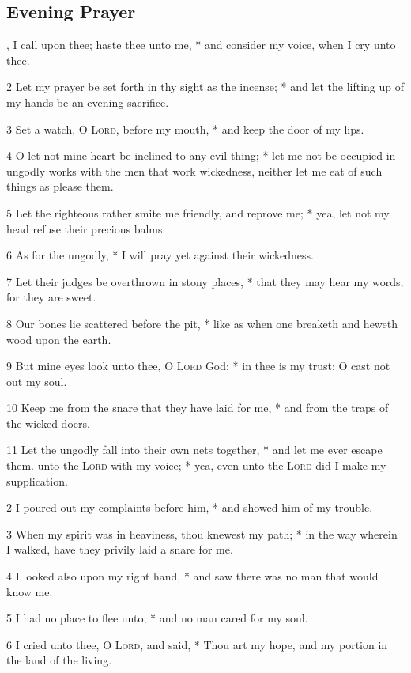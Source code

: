 \subsection{Evening Prayer}
, I call upon thee; haste thee unto me, * and consider my voice, when I cry unto thee.\par
2 Let my prayer be set forth in thy sight as the incense; * and let the lifting up of my hands be an evening sacrifice.\par
3 Set a watch, O {\textsc{Lord}}, before my mouth, * and keep the door of my lips.\par
4 O let not mine heart be inclined to any evil thing; * let me not be occupied in ungodly works with the men that work wickedness, neither let me eat of such things as please them.\par
5 Let the righteous rather smite me friendly, and reprove me; * yea, let not my head refuse their precious balms.\par
6 As for the ungodly, * I will pray yet against their wickedness.\par
7 Let their judges be overthrown in stony places, * that they may hear my words; for they are sweet.\par
8 Our bones lie scattered before the pit, * like as when one breaketh and heweth wood upon the earth.\par
9 But mine eyes look unto thee, O {\textsc{Lord}} God; * in thee is my trust; O cast not out my soul.\par
10 Keep me from the snare that they have laid for me, * and from the traps of the wicked doers.\par
11 Let the ungodly fall into their own nets together, * and let me ever escape them.
 unto the {\textsc{Lord}} with my voice; * yea, even unto the {\textsc{Lord}} did I make my supplication.\par
2 I poured out my complaints before him, * and showed him of my trouble.\par
3 When my spirit was in heaviness, thou knewest my path; * in the way wherein I walked, have they privily laid a snare for me.\par
4 I looked also upon my right hand, * and saw there was no man that would know me.\par
5 I had no place to flee unto, * and no man cared for my soul.\par
6 I cried unto thee, O {\textsc{Lord}}, and said, * Thou art my hope, and my portion in the land of the living.\par
